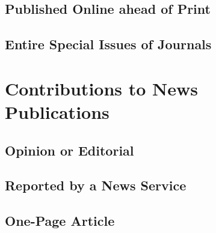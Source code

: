 \documentclass{article}
\begin{document}
\subsection{Published Online ahead of Print} %
\label{sub:published_online_ahead_of_print}
\begin{refsection}
	\nocite{Erhardt:2020wl}
	\printbibliography[heading=none]
\end{refsection}
\subsection{Entire Special Issues of Journals} %
\label{sub:entire_special_issues_of_journals}
\begin{refsection}
	\nocite{AppiahGates:1992uw}
	\printbibliography[heading=none]
\end{refsection}

\section{Contributions to News Publications} %
\label{sec:contributions_to_news_publications}
\subsection{Opinion or Editorial} %
\label{sub:opinion_or_editorial}
\begin{refsection}
	\nocite{Editorial-Board:vc,Gergen:un}
	\printbibliography[heading=none]
\end{refsection}
\subsection{Reported by a News Service} %
\label{sub:reported_by_a_news_service}
\begin{refsection}
	\nocite{Evacuation:wj}
	\printbibliography[heading=none]
\end{refsection}
\subsection{One-Page Article} %
\label{sub:one_page_article}
\begin{refsection}
	\nocite{Magra:ws,Perrier:vv,Soloski:wi}
	\printbibliography[heading=none]
\end{refsection}
\end{document}
